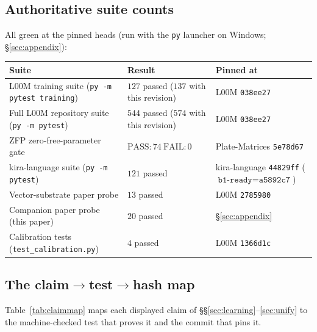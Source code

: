 \documentclass[11pt]{article}
\theoremstyle{plain}
\theoremstyle{definition}
\theoremstyle{remark}
\begin{document}
\subsection{Authoritative suite counts}
All green at the pinned heads (run with the \texttt{py} launcher on Windows; \S\ref{sec:appendix}):
\begin{center}
\begin{tabular}{lll}
\toprule
Suite & Result & Pinned at \\
\midrule
L00M training suite (\texttt{py -m pytest training}) & $127$ passed ($137$ with this revision) & L00M \texttt{038ee27} \\
Full L00M repository suite (\texttt{py -m pytest}) & $544$ passed ($574$ with this revision) & L00M \texttt{038ee27} \\
ZFP zero-free-parameter gate & $\mathrm{PASS}{:}74\ \mathrm{FAIL}{:}0$ & Plate-Matrices \texttt{5e78d67} \\
kira-language suite (\texttt{py -m pytest}) & $121$ passed & kira-language \texttt{44829ff} ($\texttt{b1-ready}=\texttt{a5892c7}$) \\
Vector-substrate paper probe & $13$ passed & L00M \texttt{2785980} \\
Companion paper probe (this paper) & $20$ passed & \S\ref{sec:appendix} \\
Calibration tests (\texttt{test\_calibration.py}) & $4$ passed & L00M \texttt{1366d1c} \\
\bottomrule
\end{tabular}
\end{center}

\subsection{The claim$\to$test$\to$hash map}
Table~\ref{tab:claimmap} maps each displayed claim of \S\S\ref{sec:learning}--\ref{sec:unify} to the
machine-checked test that proves it and the commit that pins it.
\end{document}
